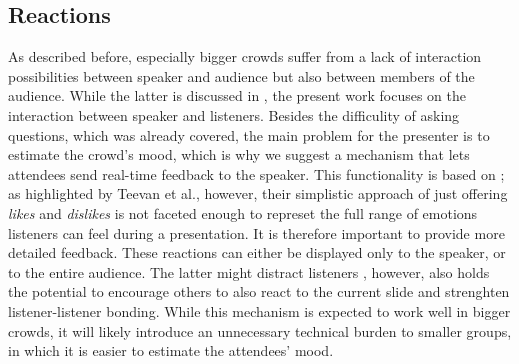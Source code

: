 \subsection{Reactions}
As described before, especially bigger crowds suffer from a lack of interaction possibilities between speaker and audience but also between members of the audience. While the latter is discussed in \cite{Bry:Backstage}, the present work focuses on the interaction between speaker and listeners. Besides the difficulity of asking questions, which was already covered, the main problem for the presenter is to estimate the crowd's mood, which is why we suggest a mechanism that lets attendees send real-time feedback to the speaker. This functionality is based on \cite{Teevan:MobileFeedbackDuringPresentation}; as highlighted by Teevan et al., however, their simplistic approach of just offering \emph{likes} and \emph{dislikes} is not faceted enough to represet the full range of emotions listeners can feel during a presentation. It is therefore important to provide more detailed feedback.
These reactions can either be displayed only to the speaker, or to the entire audience. The latter might distract listeners \cite{Teevan:MobileFeedbackDuringPresentation}, however, also holds the potential to encourage others to also react to the current slide and strenghten listener-listener bonding. While this mechanism is expected to work well in bigger crowds, it will likely introduce an unnecessary technical burden to smaller groups, in which it is easier to estimate the attendees' mood. 

